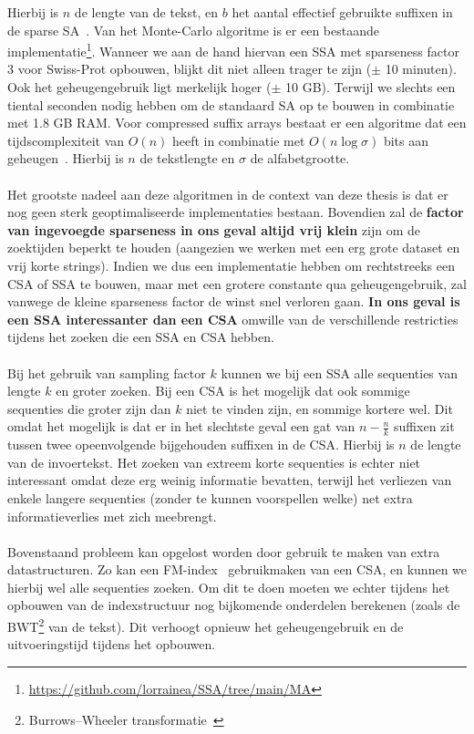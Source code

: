 Hierbij is $n$ de lengte van de tekst, en $b$ het aantal effectief gebruikte suffixen in de sparse SA~\cite{building_sparse_sa}.
Van het Monte-Carlo algoritme is er een bestaande implementatie\footnote{\url{https://github.com/lorrainea/SSA/tree/main/MA}}.
Wanneer we aan de hand hiervan een SSA met sparseness factor 3 voor Swiss-Prot opbouwen, blijkt dit niet alleen trager te zijn ($\pm$ 10 minuten).
Ook het geheugengebruik ligt merkelijk hoger ($\pm$ 10 GB).
Terwijl we slechts een tiental seconden nodig hebben om de standaard SA op te bouwen in combinatie met 1.8 GB RAM\@.
Voor compressed suffix arrays bestaat er een algoritme dat een tijdscomplexiteit van $O(n)$ heeft in combinatie met $O(n \log \sigma)$ bits aan geheugen~\cite{building_compressed_sa}.
Hierbij is $n$ de tekstlengte en $\sigma$ de alfabetgrootte.
\\ \\
Het grootste nadeel aan deze algoritmen in de context van deze thesis is dat er nog geen sterk geoptimaliseerde implementaties bestaan.
Bovendien zal de \textbf{factor van ingevoegde sparseness in ons geval altijd vrij klein} zijn om de zoektijden beperkt te houden (aangezien we werken met een erg grote dataset en vrij korte strings).
Indien we dus een implementatie hebben om rechtstreeks een CSA of SSA te bouwen, maar met een grotere constante qua geheugengebruik, zal vanwege de kleine sparseness factor de winst snel verloren gaan.
\textbf{In ons geval is een SSA interessanter dan een CSA} omwille van de verschillende restricties tijdens het zoeken die een SSA en CSA hebben.
\\ \\
Bij het gebruik van sampling factor $k$ kunnen we bij een SSA alle sequenties van lengte $k$ en groter zoeken.
Bij een CSA is het mogelijk dat ook sommige sequenties die groter zijn dan $k$ niet te vinden zijn, en sommige kortere wel.
Dit omdat het mogelijk is dat er in het slechtste geval een gat van $n - \frac{n}{k}$ suffixen zit tussen twee opeenvolgende bijgehouden suffixen in de CSA\@.
Hierbij is $n$ de lengte van de invoertekst.
Het zoeken van extreem korte sequenties is echter niet interessant omdat deze erg weinig informatie bevatten, terwijl het verliezen van enkele langere sequenties (zonder te kunnen voorspellen welke) net extra informatieverlies met zich meebrengt.
\\ \\
Bovenstaand probleem kan opgelost worden door gebruik te maken van extra datastructuren.
Zo kan een FM-index~\cite{fm_index} gebruikmaken van een CSA, en kunnen we hierbij wel alle sequenties zoeken.
Om dit te doen moeten we echter tijdens het opbouwen van de indexstructuur nog bijkomende onderdelen berekenen (zoals de BWT\footnote{Burrows–Wheeler transformatie~\cite{bwt}} van de tekst).
Dit verhoogt opnieuw het geheugengebruik en de uitvoeringstijd tijdens het opbouwen.

